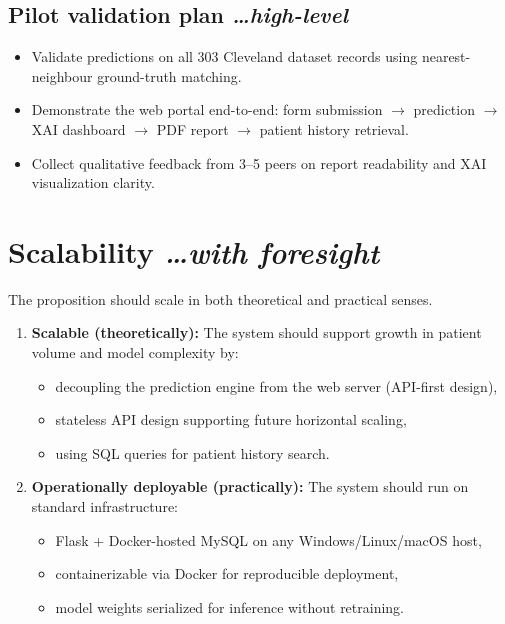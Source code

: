 \documentclass[11pt,a4paper]{article}
\newcommand{\BvrHint}[1]{%
  {\normalfont\normalsize\itshape\hfill #1}}
\begin{document}
\subsection{Pilot validation plan%
  \BvrHint{\ldots high-level}}
\begin{itemize}[leftmargin=0.7cm]
    \item Validate predictions on all 303 Cleveland dataset records
      using nearest-neighbour ground-truth matching.
    \item Demonstrate the web portal end-to-end: form submission
      $\rightarrow$ prediction $\rightarrow$ XAI dashboard
      $\rightarrow$ PDF report $\rightarrow$ patient history
      retrieval.
    \item Collect qualitative feedback from 3--5 peers on report
      readability and XAI visualization clarity.
\end{itemize}

\section{Scalability%
  \BvrHint{\ldots with foresight}}
The proposition should scale in both theoretical and practical senses.

\begin{enumerate}[leftmargin=0.7cm]
    \item \textbf{Scalable (theoretically):} The system should
    support growth in patient volume and model complexity by:
    \begin{itemize}[leftmargin=0.7cm]
        \item decoupling the prediction engine from the web server
          (API-first design),
        \item stateless API design supporting future horizontal
          scaling,
        \item using SQL queries for patient history search.
    \end{itemize}

    \item \textbf{Operationally deployable (practically):} The
    system should run on standard infrastructure:
    \begin{itemize}[leftmargin=0.7cm]
        \item Flask + Docker-hosted MySQL on any Windows/Linux/macOS host,
        \item containerizable via Docker for reproducible deployment,
        \item model weights serialized for inference without
          retraining.
    \end{itemize}
\end{enumerate}
\end{document}
